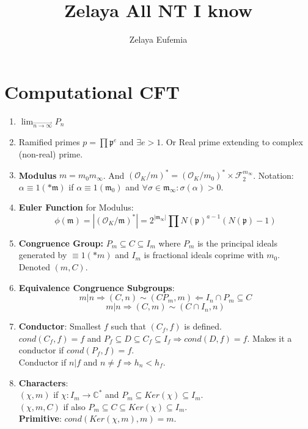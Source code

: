 \documentclass{article}
\title{Zelaya All NT I know}
\author{Zelaya Eufemia}
\date{}
\newcommand{\C}{\mathbb{C}}
\newcommand{\OO}{\mathcal{O}}
\newcommand{\pp}{\mathfrak{p}}
\newcommand{\mm}{\mathfrak{m}}
\newcommand{\FF}{\mathcal{F}}
\newcommand{\ra}{\rightarrow}
\newcommand{\Ra}{\Rightarrow}
\newcommand{\La}{\Leftarrow}
\newcommand{\limra}[1]{\lim_{\overset{\rightarrow}{#1}}}
\begin{document}
\maketitle
\section{Computational CFT}
\begin{multicols}{2}
\begin{enumerate}
\item $\limra{n \ra \infty} P_n$

\item Ramified primes $p = \prod \pp^e$ and $\exists e > 1$. Or Real prime extending to complex (non-real) prime. 

\item \textbf{Modulus} $m = m_0 m_\infty$. And $(\OO_K/m)^* = (\OO_K/m_0)^* \times \FF_2^{m_\infty}$. Notation: $\alpha \equiv 1 (*\mm)$ if $\alpha \equiv 1 (\mm_0)$ and $\forall \sigma \in \mm_\infty: \sigma(\alpha) > 0$. 

\item \textbf{Euler Function} for Modulus: 
\[\phi(\mm) = |(\OO_K/\mm)^*| = 2^{|\mm_\infty|}\prod N(\pp)^{a-1}(N(\pp) - 1)\]

\item \textbf{Congruence Group:} $P_m \subseteq C \subseteq I_m$ where $P_m$ is the principal ideals generated by $\equiv 1 (*m)$ and $I_m$ is fractional ideals coprime with $m_0$. Denoted $(m,C)$.

\item \textbf{Equivalence Congruence Subgroups}: 
\[m|n \Ra (C,n) \sim (CP_m,m) \La I_n \cap P_m \subseteq C\]
\[m|n \Ra (C,m) \sim (C \cap I_n, n)\]

\item \textbf{Conductor}: Smallest $f$ such that $(C_f,f)$ is defined.\\
$cond(C_f,f) = f$ and $P_f \subseteq D \subseteq C_f\subseteq I_f \Ra cond(D,f) = f$. Makes it a conductor if $cond(P_f,f) = f$. \\
Conductor if $n|f$ and $n \neq f \Ra h_n < h_f$. 

\item \textbf{Characters}: \\
$(\chi,m)$ if $\chi:I_m \ra \C^*$ and $P_m \subseteq Ker(\chi) \subseteq I_m$.\\
$(\chi,m, C)$ if also $P_m \subseteq C \subseteq Ker(\chi) \subseteq I_m$.\\
\textbf{Primitive}: $cond(Ker(\chi,m),m) = m$.


\end{enumerate}
\end{multicols}
\end{document}
